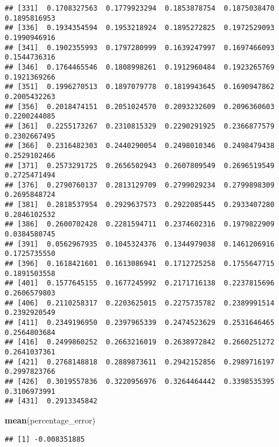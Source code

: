 \documentclass[
]{article}
\newenvironment{Shaded}{\begin{snugshade}}{\end{snugshade}}
\newcommand{\CommentTok}[1]{\textcolor[rgb]{0.56,0.35,0.01}{\textit{#1}}}
\newcommand{\DataTypeTok}[1]{\textcolor[rgb]{0.13,0.29,0.53}{#1}}
\newcommand{\KeywordTok}[1]{\textcolor[rgb]{0.13,0.29,0.53}{\textbf{#1}}}
\newcommand{\NormalTok}[1]{#1}
\newcommand{\OperatorTok}[1]{\textcolor[rgb]{0.81,0.36,0.00}{\textbf{#1}}}
\newcommand{\StringTok}[1]{\textcolor[rgb]{0.31,0.60,0.02}{#1}}
\begin{document}
\begin{verbatim}
## [331]  0.1708327563  0.1779923294  0.1853878754  0.1875038470  0.1895816953
## [336]  0.1934354594  0.1953218924  0.1895272825  0.1972529093  0.1990946916
## [341]  0.1902355993  0.1797280999  0.1639247997  0.1697466093  0.1544736316
## [346]  0.1764465546  0.1808998261  0.1912960484  0.1923265769  0.1921369266
## [351]  0.1996270513  0.1897079778  0.1819943645  0.1690947862  0.2005432263
## [356]  0.2018474151  0.2051024570  0.2093232609  0.2096360603  0.2200244085
## [361]  0.2255173267  0.2310815329  0.2290291925  0.2366877579  0.2302667495
## [366]  0.2316482303  0.2440290054  0.2498010346  0.2498479438  0.2529102466
## [371]  0.2573291725  0.2656502943  0.2607809549  0.2696519549  0.2725471494
## [376]  0.2790760137  0.2813129709  0.2799029234  0.2799898309  0.2695848724
## [381]  0.2818537954  0.2929637573  0.2922085445  0.2933407280  0.2846102532
## [386]  0.2600702428  0.2281594711  0.2374602316  0.1979822909  0.0384580745
## [391]  0.0562967935  0.1045324376  0.1344979038  0.1461206916  0.1725735550
## [396]  0.1618421601  0.1613086941  0.1712725258  0.1755647715  0.1891503558
## [401]  0.1577645155  0.1677245992  0.2171716138  0.2237815696  0.2606579803
## [406]  0.2110258317  0.2203625015  0.2275735782  0.2389991514  0.2392920549
## [411]  0.2349196950  0.2397965339  0.2474523629  0.2531646465  0.2564803684
## [416]  0.2499860252  0.2663216019  0.2638972842  0.2660251272  0.2641037361
## [421]  0.2768148818  0.2889873611  0.2942152856  0.2989716197  0.2997823766
## [426]  0.3019557836  0.3220956976  0.3264464442  0.3398535395  0.3106973991
## [431]  0.2913345842
\end{verbatim}

\begin{Shaded}
\begin{Highlighting}[]
      \KeywordTok{mean}\NormalTok{(percentage_error)}
\end{Highlighting}
\end{Shaded}

\begin{verbatim}
## [1] -0.008351885
\end{verbatim}

\begin{Shaded}
\end{Shaded}
\end{document}
